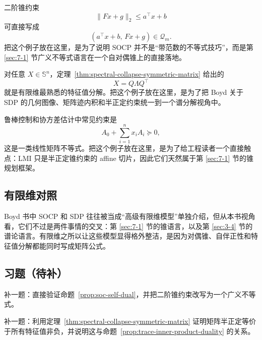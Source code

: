 \begin{example}[二阶锥几何]
二阶锥约束
\[
\|Fx+g\|_2\le a^\top x+b
\]
可直接写成
\[
(a^\top x+b,\,Fx+g)\in \mathcal Q_m.
\]
把这个例子放在这里，是为了说明 SOCP 并不是“带范数的不等式技巧”，而是第 \ref{sec:7-1} 节广义不等式语言在一个自对偶锥上的直接落地。
\end{example}

\begin{example}[对称矩阵特征值分解]
对任意 $X\in \mathbb S^n$，定理~\ref{thm:spectral-collapse-symmetric-matrix} 给出的
\[
X=Q\Lambda Q^\top
\]
就是有限维最熟悉的特征值分解。把这个例子放在这里，是为了把 Boyd 关于 SDP 的几何图像、矩阵迹内积和半正定约束统一到一个谱分解视角中。
\end{example}

\begin{example}
鲁棒控制和协方差估计中常见约束是
\[
A_0+\sum_{i=1}^n x_i A_i\succeq 0,
\]
这是一类线性矩阵不等式。把这个例子放在这里，是为了给工程读者一个直接触点：LMI 只是半正定锥约束的 affine 切片，因此它们天然属于第 \ref{sec:7-1} 节的锥规划框架。
\end{example}

\subsection*{有限维对照}

Boyd 书中 SOCP 和 SDP 往往被当成“高级有限维模型”单独介绍，但从本书视角看，它们不过是两件事情的交叉：第 \ref{sec:7-1} 节的锥语言，以及第 \ref{sec:3-4} 节的谱论语言。有限维之所以让这些模型显得格外整洁，是因为对偶锥、自伴正性和特征值分解都能同时写成矩阵公式。

\subsection*{习题（待补）}

\begin{exercise}
补一题：直接验证命题~\ref{prop:soc-self-dual}，并把二阶锥约束改写为一个广义不等式。
\end{exercise}

\begin{exercise}
补一题：利用定理~\ref{thm:spectral-collapse-symmetric-matrix} 证明矩阵半正定等价于所有特征值非负，并说明这与命题~\ref{prop:trace-inner-product-duality} 的关系。
\end{exercise}
